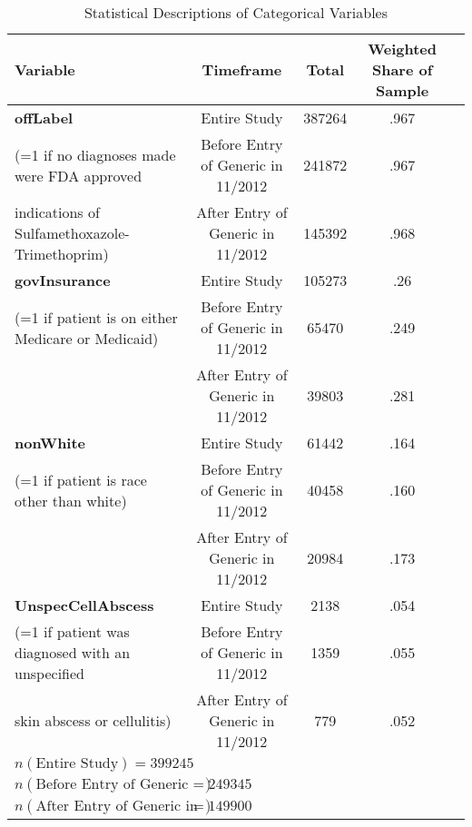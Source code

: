 \begin{table}[htbp]\centering
\def\sym#1{\ifmmode^{#1}\else\(^{#1}\)\fi}
\caption{Statistical Descriptions of Categorical Variables\label{tab1}}
\begin{tabular}{l*{4}{c}}
\hline\hline
            Variable&\multicolumn{1}{c}{Timeframe}&\multicolumn{1}{c}{Total}&\multicolumn{1}{c}{Weighted Share of Sample}\\
\hline
\textbf{offLabel}                                                &     Entire Study&             387264&      .967\\
(=1 if no diagnoses made were FDA approved          &     Before Entry of Generic in 11/2012&    241872&      .967\\
indications of Sulfamethoxazole-Trimethoprim)  &     After Entry of Generic in 11/2012&      145392&      .968\\
[1em]
\textbf{govInsurance}                                            &     Entire Study&             105273&      .26 \\
(=1 if patient is on either Medicare or Medicaid)       &     Before Entry of Generic in 11/2012&     65470 &      .249\\
                                                        &     After Entry of Generic in 11/2012&      39803 &      .281\\
[1em]
\textbf{nonWhite}                                                &     Entire Study&             61442&      .164\\
(=1 if patient is race other than white)                &     Before Entry of Generic in 11/2012&     40458&      .160\\
                                                        &     After Entry of Generic in 11/2012&      20984&      .173\\
[1em]
\textbf{UnspecCellAbscess}                                       &     Entire Study&             2138 &      .054\\
(=1 if patient was diagnosed with an unspecified        &     Before Entry of Generic in 11/2012&     1359 &      .055\\
skin abscess or cellulitis)                            &     After Entry of Generic in 11/2012&      779  &      .052\\
\hline
$n(\text{Entire Study}) = 399245$\\
$n(\text{Before Entry of Generic in 11/2012}) = 249345$\\
$n(\text{After Entry of Generic in 11/2012}) = 149900$\\
\hline\hline
\end{tabular}
\label{tab:Table4.3}
\end{table}

